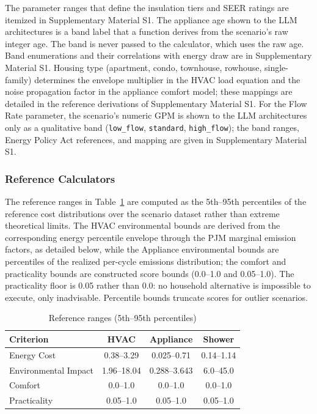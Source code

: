\documentclass[final,3p,times]{elsarticle}
\begin{document}
\FloatBarrier

The parameter ranges that define the insulation tiers and SEER ratings are itemized in Supplementary Material S1. The appliance age shown to the LLM architectures is a band label that a function derives from the scenario's raw integer age. The band is never passed to the calculator, which uses the raw age. Band enumerations and their correlations with energy draw are in Supplementary Material S1. Housing type (apartment, condo, townhouse, rowhouse, single-family) determines the envelope multiplier in the HVAC load equation and the noise propagation factor in the appliance comfort model; these mappings are detailed in the reference derivations of Supplementary Material S1. For the Flow Rate parameter, the scenario's numeric GPM is shown to the LLM architectures only as a qualitative band (\texttt{low\_flow}, \texttt{standard}, \texttt{high\_flow}); the band ranges, Energy Policy Act references, and mapping are given in Supplementary Material S1.

\FloatBarrier
\subsubsection{Reference Calculators}
\label{sec:gt-calculators}

The reference ranges in Table~\ref{table:reference_ranges} are computed as the 5th--95th percentiles of the reference cost distributions over the scenario dataset rather than extreme theoretical limits. The HVAC environmental bounds are derived from the corresponding energy percentile envelope through the PJM marginal emission factors, as detailed below, while the Appliance environmental bounds are percentiles of the realized per-cycle emissions distribution; the comfort and practicality bounds are constructed score bounds (0.0--1.0 and 0.05--1.0). The practicality floor is 0.05 rather than 0.0: no household alternative is impossible to execute, only inadvisable. Percentile bounds truncate scores for outlier scenarios.

\begin{table}[H]
\centering
\begin{threeparttable}
\centering
\small
\caption{Reference ranges (5th--95th percentiles)}
\label{table:reference_ranges}
\begin{tabular}{@{}lccc@{}}
\toprule
\textbf{Criterion} & \textbf{HVAC} & \textbf{Appliance} & \textbf{Shower} \\
\midrule
Energy Cost & 0.38--3.29 & 0.025--0.71 & 0.14--1.14 \\
Environmental Impact & 1.96--18.04 & 0.288--3.643 & 6.0--45.0 \\
Comfort & 0.0--1.0 & 0.0--1.0 & 0.0--1.0 \\
Practicality & 0.05--1.0 & 0.05--1.0 & 0.05--1.0 \\
\bottomrule
\end{tabular}
\end{threeparttable}
\end{table}
\end{document}
